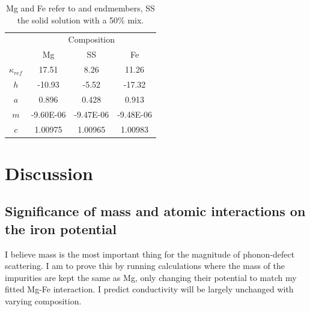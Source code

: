\begin{table}[h]
\centering
\caption[CONTENTS BIT]{\label{tab:comp-table}Mg and Fe refer to \mgsios and \fesios endmembers, SS the solid solution with a 50\% mix.}
\begin{tabular}{c|ccc}
                           & \multicolumn{3}{c}{Composition}    \\
                           & Mg             & SS           & Fe           \\ \hline
$\kappa_{ref}$  & 17.51         & 8.26        & 11.26      \\
$h$                     & -10.93        & -5.52       & -17.32     \\
$a$                     & 0.896         & 0.428       & 0.913     \\
$m$                    & -9.60E-06  & -9.47E-06 & -9.48E-06 \\
$c$                      & 1.00975    & 1.00965    & 1.00983
\end{tabular}
\end{table}




\pagebreak


\section{Discussion} 

\subsection{\label{sec:iso_pot}Significance of mass and atomic interactions on the iron potential}

I believe mass is the most important thing for the magnitude of phonon-defect scattering. I am to prove this by running calculations where the mass of the impurities are kept the same as Mg, only changing their potential to match my fitted Mg-Fe interaction. I predict conductivity will be largely unchanged with varying composition.


